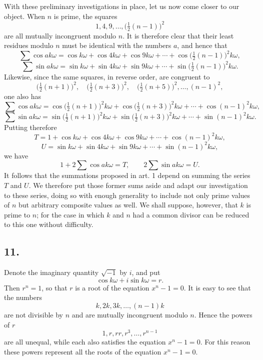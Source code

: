 \documentclass[12pt]{article}
\begin{document}
With these preliminary investigations in place, let us now come closer to our object. When $n$ is prime, the squares
\[
1,4,9,\ldots,\bigl(\tfrac12(n-1)\bigr)^2
\]
are all mutually incongruent modulo $n$. It is therefore clear that their least residues modulo $n$ must be identical with the numbers $a$, and hence that
\[
\sum\cos ak\omega=\cos k\omega+\cos4k\omega+\cos9k\omega+\cdots+
\cos\bigl(\tfrac12(n-1)\bigr)^2k\omega,
\]
\[
\sum\sin ak\omega=\sin k\omega+\sin4k\omega+\sin9k\omega+\cdots+
\sin\bigl(\tfrac12(n-1)\bigr)^2k\omega.
\]
Likewise, since the same squares, in reverse order, are congruent to
\[
\bigl(\tfrac12(n+1)\bigr)^2,\quad
\bigl(\tfrac12(n+3)\bigr)^2,\quad
\bigl(\tfrac12(n+5)\bigr)^2,\ldots,(n-1)^2,
\]
one also has
\[
\sum\cos ak\omega=\cos\bigl(\tfrac12(n+1)\bigr)^2k\omega+
\cos\bigl(\tfrac12(n+3)\bigr)^2k\omega+\cdots+\cos(n-1)^2k\omega,
\]
\[
\sum\sin ak\omega=\sin\bigl(\tfrac12(n+1)\bigr)^2k\omega+
\sin\bigl(\tfrac12(n+3)\bigr)^2k\omega+\cdots+\sin(n-1)^2k\omega.
\]
Putting therefore
\[
T=1+\cos k\omega+\cos4k\omega+\cos9k\omega+\cdots+\cos(n-1)^2k\omega,
\]
\[
U=\sin k\omega+\sin4k\omega+\sin9k\omega+\cdots+\sin(n-1)^2k\omega,
\]
we have
\[
1+2\sum\cos ak\omega=T,\qquad 2\sum\sin ak\omega=U.
\]
It follows that the summations proposed in art. 1 depend on summing the series $T$ and $U$. We therefore put those former sums aside and adapt our investigation to these series, doing so with enough generality to include not only prime values of $n$ but arbitrary composite values as well. We shall suppose, however, that $k$ is prime to $n$; for the case in which $k$ and $n$ had a common divisor can be reduced to this one without difficulty.

\subsection*{11.}

Denote the imaginary quantity $\sqrt{-1}$ by $i$, and put
\[
\cos k\omega+i\sin k\omega=r.
\]
Then $r^n=1$, so that $r$ is a root of the equation $x^n-1=0$. It is easy to see that the numbers
\[
k,2k,3k,\ldots,(n-1)k
\]
are not divisible by $n$ and are mutually incongruent modulo $n$. Hence the powers of $r$
\[
1,r,rr,r^3,\ldots,r^{n-1}
\]
are all unequal, while each also satisfies the equation $x^n-1=0$. For this reason these powers represent all the roots of the equation $x^n-1=0$.
\end{document}
